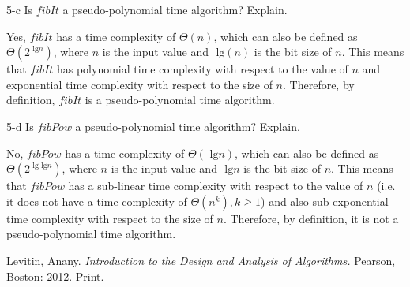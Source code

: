 \documentclass[11pt]{article}
\newcommand{\tlg}{\text{ lg}}
\begin{document}
\begin{prob}{5-c}
Is $fibIt$ a pseudo-polynomial time algorithm? Explain.
\end{prob}
\begin{sol}

Yes, $fibIt$ has a time complexity of $\Theta(n)$, which can also be defined as $\Theta(2^{\tlg n})$, where $n$ is the input value and $\tlg (n)$ is the bit size of $n$. This means that $fibIt$ has polynomial time complexity with respect to the value of $n$ and exponential time complexity with respect to the size of $n$. Therefore, by definition, $fibIt$ is a pseudo-polynomial time algorithm.
\end{sol}

\begin{prob}{5-d}
Is $fibPow$ a pseudo-polynomial time algorithm? Explain.
\end{prob}
\begin{sol}

No, $fibPow$ has a time complexity of $\Theta(\tlg n)$, which can also be defined as $\Theta(2^{\tlg \tlg n})$, where $n$ is the input value and $\tlg n$ is the bit size of $n$. This means that $fibPow$ has a sub-linear time complexity with respect to the value of $n$ (i.e. it does not have a time complexity of $\Theta(n^{k}), k \geq 1$) and also sub-exponential time complexity with respect to the size of $n$. Therefore, by definition, it is not a pseudo-polynomial time algorithm.


\end{sol}

\begin{thebibliography}{}
Levitin, Anany. {\it Introduction to the Design and Analysis of Algorithms.} Pearson, Boston: 2012. Print.
\end{thebibliography}
\end{document}
